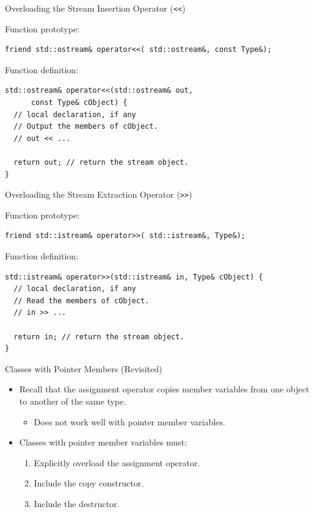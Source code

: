 \documentclass[14pt,aspectratio=1610, hyperref={pdfpagelayout=SinglePage}]{beamer}
\begin{document}
\begin{frame}[fragile]{Overloading the Stream Insertion Operator
(\texttt{{<}<})}
\protect\hypertarget{overloading-the-stream-insertion-operator}{}

  Function prototype:
  \begin{lstlisting}
friend std::ostream& operator<<( std::ostream&, const Type&);
\end{lstlisting}

  Function definition:
  \begin{lstlisting}
std::ostream& operator<<(std::ostream& out,
      const Type& cObject) {
  // local declaration, if any
  // Output the members of cObject.
  // out << ...

  return out; // return the stream object.
}\end{lstlisting}

\end{frame}

\begin{frame}[fragile]{Overloading the Stream Extraction Operator
  (\texttt{{>}>})}

  Function prototype:
  \begin{lstlisting}
friend std::istream& operator>>( std::istream&, Type&);
\end{lstlisting}

  Function definition:
  \begin{lstlisting}
std::istream& operator>>(std::istream& in, Type& cObject) {
  // local declaration, if any
  // Read the members of cObject.
  // in >> ...

  return in; // return the stream object.
}\end{lstlisting}

\end{frame}

\begin{frame}{Classes with Pointer Members (Revisited)}
\begin{itemize}
\item
  Recall that the assignment operator copies member variables from one
  object to another of the same type.
  \begin{itemize}
  \item
    Does not work well with pointer member variables.
  \end{itemize}
\item
  Classes with pointer member variables must:
  \begin{enumerate}
  \item
    Explicitly overload the assignment operator.
  \item
    Include the copy constructor.
  \item
    Include the destructor.
  \end{enumerate}
\end{itemize}
\end{frame}
\end{document}

